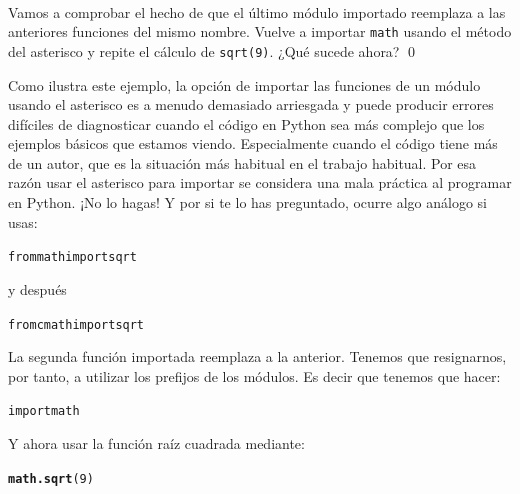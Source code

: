 \documentclass[10pt,a4paper]{article}\usepackage[]{graphicx}\usepackage[]{color}
\makeatletter
\newcommand{\hlnum}[1]{\textcolor[rgb]{0.686,0.059,0.569}{#1}}%
\newcommand{\hlstd}[1]{\textcolor[rgb]{0.345,0.345,0.345}{#1}}%
\newcommand{\hlkwd}[1]{\textcolor[rgb]{0.737,0.353,0.396}{\textbf{#1}}}%
\newenvironment{kframe}{%
 \def\at@end@of@kframe{}%
 \ifinner\ifhmode%
  \def\at@end@of@kframe{\end{minipage}}%
  \begin{minipage}{\columnwidth}%
 \fi\fi%
 \def\FrameCommand##1{\hskip\@totalleftmargin \hskip-\fboxsep
 \colorbox{shadecolor}{##1}\hskip-\fboxsep
     \hskip-\linewidth \hskip-\@totalleftmargin \hskip\columnwidth}%
 \MakeFramed {\advance\hsize-\width
   \@totalleftmargin\z@ \linewidth\hsize
   \@setminipage}}%
 {\par\unskip\endMakeFramed%
 \at@end@of@kframe}
\newenvironment{knitrout}{}{} %
\makeatother
\begin{document}
\begin{ejercicio}
\label{tut02:ejercicio05}
\quad\\
Vamos a comprobar el hecho de que el último módulo importado reemplaza a las anteriores funciones del mismo nombre. Vuelve a importar {\tt math} usando el método del asterisco y repite el cálculo de {\tt sqrt(9)}. ¿Qué sucede ahora?
\qed
\end{ejercicio}

Como ilustra este ejemplo, la opción de importar las funciones de un módulo usando el asterisco es a menudo demasiado arriesgada y puede producir errores difíciles de diagnosticar cuando el código en Python sea más complejo que los ejemplos básicos que estamos viendo. Especialmente cuando el código tiene más de un autor, que es la situación más habitual en el trabajo habitual. Por esa razón usar el asterisco para importar se considera una {\sf mala práctica} al programar en Python. ¡No lo hagas! Y por si te lo has preguntado, ocurre algo análogo si usas:
\begin{knitrout}
\color{fgcolor}\begin{kframe}
\begin{alltt}
from math import sqrt
\end{alltt}
\end{kframe}
\end{knitrout}
y después
\begin{knitrout}
\color{fgcolor}\begin{kframe}
\begin{alltt}
from cmath import sqrt
\end{alltt}
\end{kframe}
\end{knitrout}
La segunda función importada reemplaza a la anterior. Tenemos que resignarnos, por tanto, a utilizar los prefijos de los módulos. Es decir que tenemos que hacer:
\begin{knitrout}
\color{fgcolor}\begin{kframe}
\begin{alltt}
import math
\end{alltt}
\end{kframe}
\end{knitrout}
Y ahora usar la función raíz cuadrada mediante:
\begin{knitrout}
\color{fgcolor}\begin{kframe}
\begin{alltt}
\hlkwd{math.sqrt}\hlstd{(}\hlnum{9}\hlstd{)}
\end{alltt}
\end{kframe}
\end{knitrout}
\end{document}

